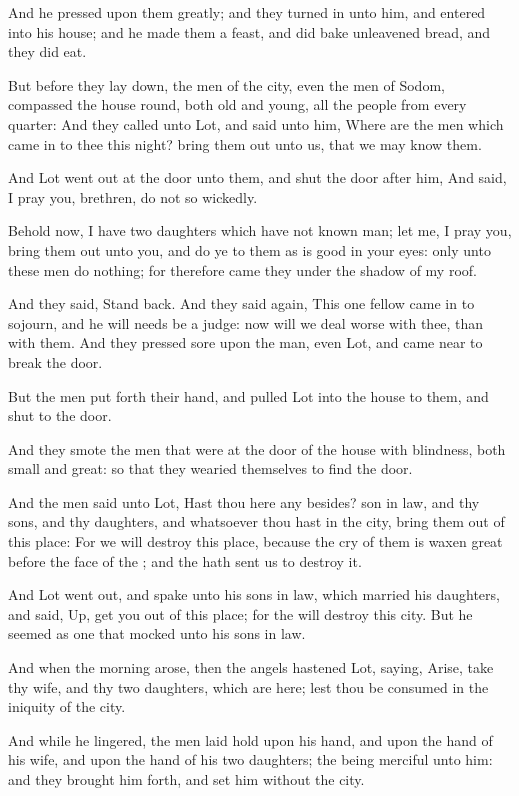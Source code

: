 \Verse And he pressed upon them greatly; and they turned in unto him, and entered into his house; and he made them a feast, and did bake unleavened bread, and they did eat.

\Verse But before they lay down, the men of the city, even the men of Sodom, compassed the house round, both old and young, all the people from every quarter: \Verse And they called unto Lot, and said unto him, Where are the men which came in to thee this night? bring them out unto us, that we may know them.

\Verse And Lot went out at the door unto them, and shut the door after him, \Verse And said, I pray you, brethren, do not so wickedly.

\Verse Behold now, I have two daughters which have not known man; let me, I pray you, bring them out unto you, and do ye to them as is good in your eyes: only unto these men do nothing; for therefore came they under the shadow of my roof.

\Verse And they said, Stand back. And they said again, This one fellow came in to sojourn, and he will needs be a judge: now will we deal worse with thee, than with them. And they pressed sore upon the man, even Lot, and came near to break the door.

\Verse But the men put forth their hand, and pulled Lot into the house to them, and shut to the door.

\Verse And they smote the men that were at the door of the house with blindness, both small and great: so that they wearied themselves to find the door.

\Verse And the men said unto Lot, Hast thou here any besides? son in law, and thy sons, and thy daughters, and whatsoever thou hast in the city, bring them out of this place: \Verse For we will destroy this place, because the cry of them is waxen great before the face of the \LORD; and the \LORD hath sent us to destroy it.

\Verse And Lot went out, and spake unto his sons in law, which married his daughters, and said, Up, get you out of this place; for the \LORD will destroy this city. But he seemed as one that mocked unto his sons in law.

\Verse And when the morning arose, then the angels hastened Lot, saying, Arise, take thy wife, and thy two daughters, which are here; lest thou be consumed in the iniquity of the city.

\Verse And while he lingered, the men laid hold upon his hand, and upon the hand of his wife, and upon the hand of his two daughters; the \LORD being merciful unto him: and they brought him forth, and set him without the city.

